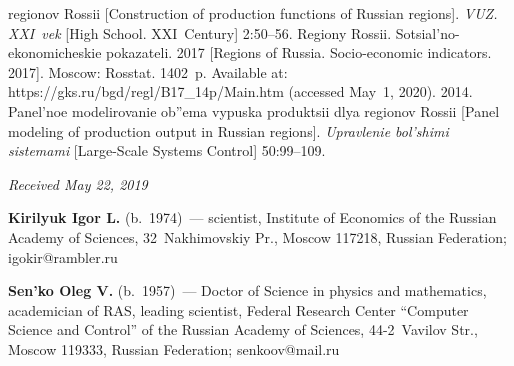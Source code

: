 \begin{multicols}{2}
{{\begin{thebibliography}{99}
regionov Rossii [Construction of production functions of Russian regions]. 
\textit{VUZ. XXI~vek} [High School. XXI~Century] 2:50--56.
Regiony Rossii. Sotsial'no-ekonomicheskie pokazateli. 2017 [Regions of Russia. 
Socio-economic indicators. 2017]. Moscow: Rosstat. 1402~p. Available at: 
{\sf https://gks.ru/bgd/regl/B17\_14p/Main.htm} (accessed May~1, 2020).
 2014. 
Panel'noe modelirovanie ob''ema vypuska produktsii dlya regionov Rossii 
[Panel modeling of production output in Russian regions]. 
\textit{Upravlenie bol'shimi sistemami} [Large-Scale Systems Control] 50:99--109.

\end{thebibliography}

 }
 }

\end{multicols}

\vspace*{-9pt}

\hfill{\small\textit{Received May 22, 2019}}



\Contr

\noindent
\textbf{Kirilyuk Igor L.} (b.\ 1974)~--- scientist, Institute of Economics of the Russian Academy of 
Sciences, 32~Nakhimovskiy Pr., Moscow 117218, Russian Federation; \mbox{igokir@rambler.ru}

\vspace*{3pt}

\noindent
\textbf{Sen'ko Oleg V.} (b.\ 1957)~--- Doctor of Science in physics and mathematics, academician of RAS, 
leading scientist, Federal Research Center ``Computer Science and Control'' of the Russian Academy of 
Sciences, 44-2~Vavilov Str., Moscow 119333, Russian Federation; \mbox{senkoov@mail.ru}
  
\label{end\stat}

\renewcommand{\bibname}{\protect\rm Литература} 
  